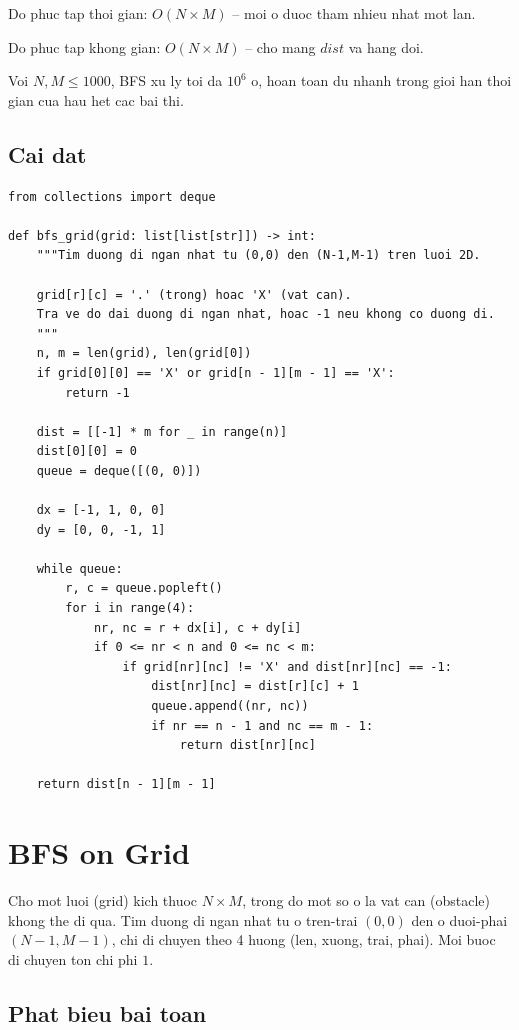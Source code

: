 Do phuc tap thoi gian: $O(N \times M)$ -- moi o duoc tham nhieu nhat mot lan.

Do phuc tap khong gian: $O(N \times M)$ -- cho mang $dist$ va hang doi.

Voi $N, M \leq 1000$, BFS xu ly toi da $10^6$ o, hoan toan du nhanh trong gioi han thoi gian cua hau het cac bai thi.

\subsection{Cai dat}

\begin{lstlisting}
from collections import deque

def bfs_grid(grid: list[list[str]]) -> int:
    """Tim duong di ngan nhat tu (0,0) den (N-1,M-1) tren luoi 2D.

    grid[r][c] = '.' (trong) hoac 'X' (vat can).
    Tra ve do dai duong di ngan nhat, hoac -1 neu khong co duong di.
    """
    n, m = len(grid), len(grid[0])
    if grid[0][0] == 'X' or grid[n - 1][m - 1] == 'X':
        return -1

    dist = [[-1] * m for _ in range(n)]
    dist[0][0] = 0
    queue = deque([(0, 0)])

    dx = [-1, 1, 0, 0]
    dy = [0, 0, -1, 1]

    while queue:
        r, c = queue.popleft()
        for i in range(4):
            nr, nc = r + dx[i], c + dy[i]
            if 0 <= nr < n and 0 <= nc < m:
                if grid[nr][nc] != 'X' and dist[nr][nc] == -1:
                    dist[nr][nc] = dist[r][c] + 1
                    queue.append((nr, nc))
                    if nr == n - 1 and nc == m - 1:
                        return dist[nr][nc]

    return dist[n - 1][m - 1]
\end{lstlisting}

\section{BFS on Grid}

Cho mot luoi (grid) kich thuoc $N \times M$, trong do mot so o la vat can (obstacle) khong the di qua. Tim duong di ngan nhat tu o tren-trai $(0, 0)$ den o duoi-phai $(N-1, M-1)$, chi di chuyen theo 4 huong (len, xuong, trai, phai). Moi buoc di chuyen ton chi phi $1$.

\subsection{Phat bieu bai toan}

